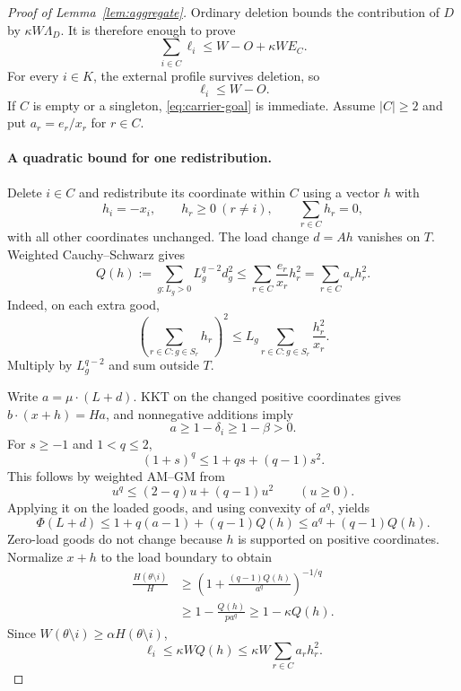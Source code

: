 \documentclass[11pt]{article}
\begin{document}
\begin{proof}[Proof of Lemma~\ref{lem:aggregate}]
Ordinary deletion bounds the contribution of $D$ by
$\kappa W\Lambda_D$.
It is therefore enough to prove
\begin{equation}
\label{eq:carrier-goal}
\sum_{i\in C}\ell_i
\le W-O+\kappa WE_C.
\end{equation}
For every $i\in K$, the external profile survives deletion, so
\begin{equation}
\label{eq:absorb}
\ell_i\le W-O.
\end{equation}
If $C$ is empty or a singleton, \eqref{eq:carrier-goal} is
immediate.
Assume $|C|\ge2$ and put $a_r=e_r/x_r$ for $r\in C$.

\paragraph{A quadratic bound for one redistribution.}
Delete $i\in C$ and redistribute its coordinate within $C$
using a vector $h$ with
\[
h_i=-x_i,
\qquad
h_r\ge0\ (r\ne i),
\qquad
\sum_{r\in C}h_r=0,
\]
with all other coordinates unchanged.
The load change $d=Ah$ vanishes on $T$.
Weighted Cauchy--Schwarz gives
\begin{equation}
\label{eq:diagonal-bound}
Q(h):=\sum_{g:L_g>0}L_g^{q-2}d_g^2
\le
\sum_{r\in C}\frac{e_r}{x_r}h_r^2
=
\sum_{r\in C}a_rh_r^2.
\end{equation}
Indeed, on each extra good,
\[
\left(\sum_{r\in C:g\in S_r}h_r\right)^2
\le
L_g\sum_{r\in C:g\in S_r}\frac{h_r^2}{x_r}.
\]
Multiply by $L_g^{q-2}$ and sum outside $T$.

Write $a=\mu\cdot(L+d)$.
KKT on the changed positive coordinates gives
$b\cdot(x+h)=Ha$, and nonnegative additions imply
\[
a\ge1-\delta_i\ge1-\beta>0.
\]
For $s\ge-1$ and $1<q\le2$,
\[
(1+s)^q\le1+qs+(q-1)s^2.
\]
This follows by weighted AM--GM from
\[
u^q\le(2-q)u+(q-1)u^2
\qquad(u\ge0).
\]
Applying it on the loaded goods, and using convexity of $a^q$,
yields
\[
\Phi(L+d)
\le1+q(a-1)+(q-1)Q(h)
\le a^q+(q-1)Q(h).
\]
Zero-load goods do not change because $h$ is supported on
positive coordinates.
Normalize $x+h$ to the load boundary to obtain
\begin{align*}
\frac{H(\theta\setminus i)}H
&\ge
\left(1+\frac{(q-1)Q(h)}{a^q}\right)^{-1/q}\\
&\ge
1-\frac{Q(h)}{pa^q}
\ge1-\kappa Q(h).
\end{align*}
Since $W(\theta\setminus i)\ge\alpha H(\theta\setminus i)$,
\begin{equation}
\label{eq:redistribution-loss}
\ell_i
\le\kappa WQ(h)
\le\kappa W\sum_{r\in C}a_rh_r^2.
\end{equation}


\end{proof}
\end{document}
